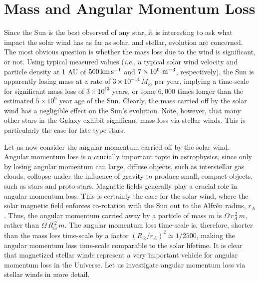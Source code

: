 \section{Mass and Angular Momentum Loss}
Since the Sun is the best observed of any star, it is interesting to
ask what impact the solar wind has as far as solar, and stellar, evolution
are concerned. The most obvious question is whether the mass loss due
to the wind is significant, or not. Using typical measured values ({\em i.e.},
a typical solar wind velocity and particle density at 1 AU of 
$500\,{\rm km}\,{\rm s}^{-1}$ and $7\times 10^6\,\,{\rm m}^{-3}$, respectively),
the Sun is apparently losing mass at a rate of $3\times 10^{-14}\,M_\odot$
per year, implying a time-scale for significant mass loss of $3\times 10^{13}$
years, or some $6,000$ times longer than the estimated $5\times 10^9$ year
age of the Sun. Clearly, the mass carried off by the solar wind has a negligible
effect on the Sun's evolution. Note, however, that many other stars in the Galaxy
exhibit significant mass loss via stellar winds. This is particularly
the case for late-type stars.

Let us now consider the angular momentum carried off by the solar wind.
Angular momentum loss is a crucially important topic in astrophysics, since
only by losing angular momentum can large, diffuse objects, such as
interstellar gas clouds, collapse under the influence of gravity to produce
small, compact objects, such as stars and proto-stars. Magnetic fields
generally play a crucial role in angular momentum loss. This is certainly
the case for the solar wind, where the solar magnetic field enforces
co-rotation with the Sun out to the Alfv\'{e}n radius, $r_A$. Thus, the
angular momentum carried away by a particle of mass $m$ is ${\Omega}\,r_A^{~2}\,
m$, rather than ${\Omega}\,R_\odot^{~2}\,m$. The angular momentum
loss time-scale is, therefore, shorter than the mass loss time-scale by a factor
$(R_\odot/r_A)^2\simeq 1/2500$, making the angular momentum loss time-scale
comparable to the solar lifetime. It is clear that magnetized stellar
winds represent a very important vehicle for angular momentum loss in the
Universe. Let us investigate angular momentum loss via
stellar winds in more detail.

